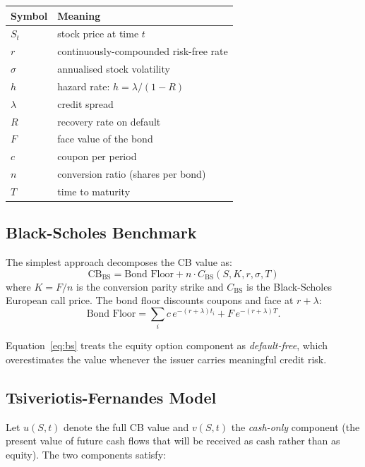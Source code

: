 \documentclass[11pt, a4paper]{article}
\begin{document}
\begin{center}
\begin{tabular}{ll}
\toprule
Symbol & Meaning \\
\midrule
$S_t$ & stock price at time $t$ \\
$r$   & continuously-compounded risk-free rate \\
$\sigma$ & annualised stock volatility \\
$h$   & hazard rate: $h = \lambda / (1-R)$ \\
$\lambda$ & credit spread \\
$R$   & recovery rate on default \\
$F$   & face value of the bond \\
$c$   & coupon per period \\
$n$   & conversion ratio (shares per bond) \\
$T$   & time to maturity \\
\bottomrule
\end{tabular}
\end{center}

\subsection{Black-Scholes Benchmark}

The simplest approach decomposes the CB value as:
\begin{equation}
  \text{CB}_{\text{BS}} = \text{Bond Floor} + n \cdot C_{\text{BS}}(S, K, r, \sigma, T)
  \label{eq:bs}
\end{equation}
where $K = F/n$ is the conversion parity strike and $C_{\text{BS}}$
is the Black-Scholes European call price.  The bond floor discounts
coupons and face at $r + \lambda$:
\begin{equation}
  \text{Bond Floor} = \sum_{i} c \, e^{-(r+\lambda) t_i} + F \, e^{-(r+\lambda) T}.
\end{equation}

Equation~\eqref{eq:bs} treats the equity option component as \emph{default-free},
which overestimates the value whenever the issuer carries meaningful credit risk.

\subsection{Tsiveriotis-Fernandes Model}

Let $u(S,t)$ denote the full CB value and $v(S,t)$ the \emph{cash-only}
component (the present value of future cash flows that will be received
as cash rather than as equity).  The two components satisfy:
\end{document}
